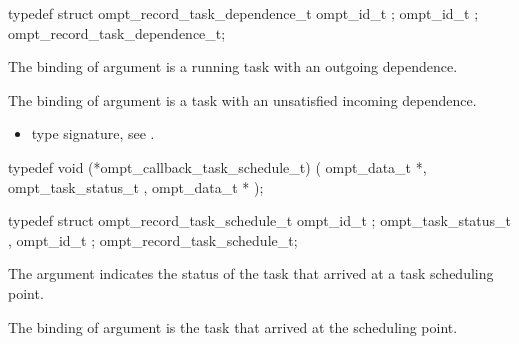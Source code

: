 \record

\begin{ccppspecific}
\begin{omptRecord}
typedef struct ompt_record_task_dependence_t {
  ompt_id_t ;
  ompt_id_t ;
} ompt_record_task_dependence_t;
\end{omptRecord}
\end{ccppspecific}


\argdesc

The binding of argument  is a running task
with an outgoing dependence.

The binding of argument  is a task with an
unsatisfied incoming dependence.


\crossreferences
\begin{itemize}
\item {} type signature, see
.
\end{itemize}



\label{sec:ompt_callback_task_schedule_t}
\format

\begin{ccppspecific}
\begin{omptCallback}
typedef void (*ompt_callback_task_schedule_t) (
  ompt_data_t *,
  ompt_task_status_t ,
  ompt_data_t *
);
\end{omptCallback}
\end{ccppspecific}


\record

\begin{ccppspecific}
\begin{omptRecord}
typedef struct ompt_record_task_schedule_t {
  ompt_id_t ;
  ompt_task_status_t ,
  ompt_id_t ;
} ompt_record_task_schedule_t;
\end{omptRecord}
\end{ccppspecific}


\argdesc

The argument  indicates the status of
the task that arrived at a task scheduling point.

The binding of argument  is the task that
arrived at the scheduling point.

